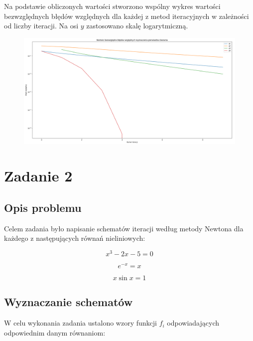 \documentclass{article}
\begin{document}
	Na podstawie obliczonych wartości stworzono wspólny wykres wartości bezwzględnych błędów względnych dla każdej z metod iteracyjnych w zależności od liczby iteracji. Na osi $y$ zastosowano skalę logarytmiczną.

	\begin{figure}[h]
		\centering
		\includegraphics[scale = 0.3]{wykres2.png}
	\end{figure}



	\section*{Zadanie 2}
	
	\subsection*{Opis problemu}

	Celem zadania było napisanie schematów iteracji według metody Newtona dla każdego z następujących równań nieliniowych:
	
	\begin{equation}
		x^3 - 2x -5 = 0
	\end{equation}

	\begin{equation}
		e^{-x} = x
	\end{equation}

	\begin{equation}
		x \sin x = 1
	\end{equation}

	\subsection*{Wyznaczanie schematów}

	W celu wykonania zadania ustalono wzory funkcji $f_i$ odpowiadających odpowiednim danym równaniom:
\end{document}
